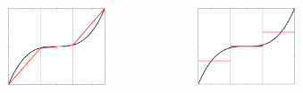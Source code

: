 \begin{frame}
\begin{columns}[t]
\begin{figure}[ht]
				\includegraphics[height=0.31\textheight]{img/fem_cropped.pdf}
			\end{figure}
			\begin{figure}[htbp]
				\vspace{-0.6cm}
				\includegraphics[height=0.31\textheight]{img/fvm.pdf}
			\end{figure} 
			\begin{figure}[htbp]
				\vspace{-0.6cm}

\end{figure}
\end{columns}
\end{frame}
